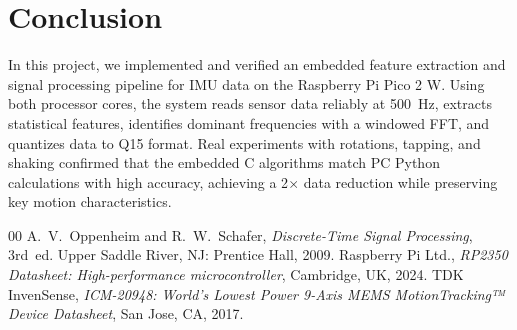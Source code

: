 \documentclass[conference]{IEEEtran}
\begin{document}
\section{Conclusion}
In this project, we implemented and verified an embedded feature extraction and signal processing pipeline for IMU data on the Raspberry Pi Pico 2 W. Using both processor cores, the system reads sensor data reliably at 500~Hz, extracts statistical features, identifies dominant frequencies with a windowed FFT, and quantizes data to Q15 format. Real experiments with rotations, tapping, and shaking confirmed that the embedded C algorithms match PC Python calculations with high accuracy, achieving a 2$\times$ data reduction while preserving key motion characteristics.

\begin{thebibliography}{00}
 A.~V.~Oppenheim and R.~W.~Schafer, \emph{Discrete-Time Signal Processing}, 3rd~ed. Upper Saddle River, NJ: Prentice Hall, 2009.
 Raspberry Pi Ltd., \emph{RP2350 Datasheet: High-performance microcontroller}, Cambridge, UK, 2024.
 TDK InvenSense, \emph{ICM-20948: World’s Lowest Power 9-Axis MEMS MotionTracking™ Device Datasheet}, San Jose, CA, 2017.
\end{thebibliography}
\end{document}
